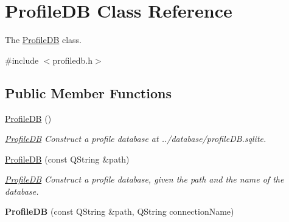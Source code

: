 \hypertarget{classProfileDB}{}\section{Profile\+DB Class Reference}
\label{classProfileDB}


The \hyperlink{classProfileDB}{Profile\+DB} class.  




{\ttfamily \#include $<$profiledb.\+h$>$}

\subsection*{Public Member Functions}
\begin{DoxyCompactItemize}
\item 
\hyperlink{classProfileDB_a103ccd5b1853eb19e3517ab4e4697a4e}{Profile\+DB} ()\hypertarget{classProfileDB_a103ccd5b1853eb19e3517ab4e4697a4e}{}\label{classProfileDB_a103ccd5b1853eb19e3517ab4e4697a4e}

\begin{DoxyCompactList}\small\item\em \hyperlink{classProfileDB}{Profile\+DB} Construct a profile database at ../database/profile\+DB.sqlite. \end{DoxyCompactList}\item 
\hyperlink{classProfileDB_a51a19d9b646130c7825e4fc813066536}{Profile\+DB} (const Q\+String \&path)
\begin{DoxyCompactList}\small\item\em \hyperlink{classProfileDB}{Profile\+DB} Construct a profile database, given the path and the name of the database. \end{DoxyCompactList}\item 
{\bfseries Profile\+DB} (const Q\+String \&path, Q\+String connection\+Name)\hypertarget{classProfileDB_a15f7c0d60b0804285e3ce6d4f9aafa47}{}\label{classProfileDB_a15f7c0d60b0804285e3ce6d4f9aafa47}


\end{DoxyCompactItemize}
